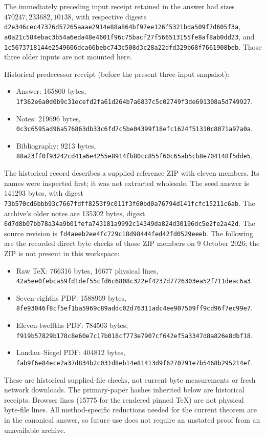 \documentclass[12pt]{article}
\begin{document}
The immediately preceding input receipt retained in the answer had
sizes \(470247,233682,10138\), with respective digests
\nolinkurl{d2e346cec47376d57265aaae2914e88a864bf97ee126f5321bda509f7d605f3a},
\nolinkurl{a0a21c584ebac3b54a6eda48e4601f96c75bacf27f566513155fe8af8ab0dd23},
and
\nolinkurl{1c5673718144e2549606dca66bebc743c508d3c28a22dfd329b68f7661908beb}.
Those three older inputs are not mounted here.

Historical predecessor receipt (before the present three-input snapshot):
\begin{itemize}
\item Answer: 165800 bytes,
\nolinkurl{1f362e6a0d0b9c31ecefd2fa61d264b7a6837c5c02749f3de691308a5d749927}.
\item Notes: 219696 bytes,
\nolinkurl{0c3c6595ad96a576863db33c6fd7c5be04399f18efc1624f51310c8071a97a0a}.
\item Bibliography: 9213 bytes,
\nolinkurl{88a23ff0f93242cd41a6e4255e8914fb80cc855f60c65ab5cb8e704148f5dde5}.
\end{itemize}
The historical record describes a supplied reference ZIP with eleven members.
Its names were inspected first; it was not extracted wholesale.  The seed answer is 141293 bytes,
with digest
\nolinkurl{73b570cd6bbb93c7667fdff8253f9c011f3f60bd0a76794d141fcfc15211c6ab}.
The archive's older notes are 135302 bytes, digest
\nolinkurl{6d7d8b07bb78a34a9b01fefa743181a9992c14349da824d30196dc5e2fe2a42d}.
The source revision is
\nolinkurl{fd4aeeb2ee4fc729c18d98444fed42fd0529eeeb}.
The following are the recorded direct byte checks of those ZIP members
on 9 October 2026; the ZIP is not present in this workspace:
\begin{itemize}
\item Raw TeX: 766316 bytes, 16677 physical lines,
\nolinkurl{42a5ee0febca59fd1def55cfd6c6808c322ef4237d7726303ea52f711deac6a3}.
\item Seven-eighths PDF: 1588969 bytes,
\nolinkurl{8fe93046f8cf5ef1ba5969c89addc02d76311adc4ee907509ff9cd96f7ec99e7}.
\item Eleven-twelfths PDF: 784503 bytes,
\nolinkurl{f919b57829b178c8e60e7c17b018cf773e7907cf642ef5a3347d8a826e8dbf18}.
\item Landau--Siegel PDF: 404812 bytes,
\nolinkurl{fab9f6e84ece2a37d834b2c031d8eb14e81413d9f6270791e7b5468b295214ef}.
\end{itemize}
These are historical supplied-file checks, not current byte measurements
or fresh network downloads.
The primary-paper hashes inherited below are historical receipts.
Browser lines (15775 for the rendered pinned TeX) are not physical
byte-file lines.  All method-specific reductions needed for the
current theorem are in the canonical answer, so future use does not
require an unstated proof from an unavailable archive.
\end{document}

